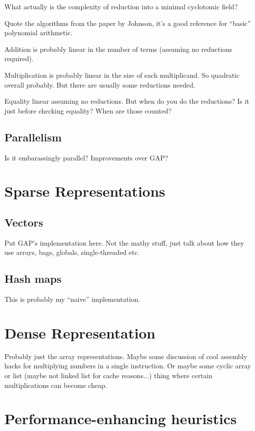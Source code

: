 \documentclass{article}
\begin{document}
What actually is the complexity of reduction into a minimal cyclotomic
field?

Quote the algorithms from the paper by Johnson, it's a good reference
for ``basic'' polynomial arithmetic.

Addition is probably linear in the number of terms (assuming no
reductions required).

Multiplication is probably linear in the size of each multiplicand. So
quadratic overall probably. But there are usually some reductions
needed.

Equality linear assuming no reductions. But when do you do the
reductions? Is it just before checking equality? When are those
counted?

\subsection{Parallelism}

Is it embarassingly parallel? Improvements over GAP?

\section{Sparse Representations}

\subsection{Vectors}

Put GAP's implementation here. Not the mathy stuff, just talk about
how they use arrays, bags, globals, single-threaded etc.

\subsection{Hash maps}

This is probably my ``naive'' implementation.

\section{Dense Representation}

Probably just the array representations. Maybe some discussion of cool
assembly hacks for multiplying numbers in a single instruction. Or
maybe some cyclic array or list (maybe not linked list for cache
reasons...) thing where certain multiplications can become cheap.

\section{Performance-enhancing heuristics}
\end{document}
